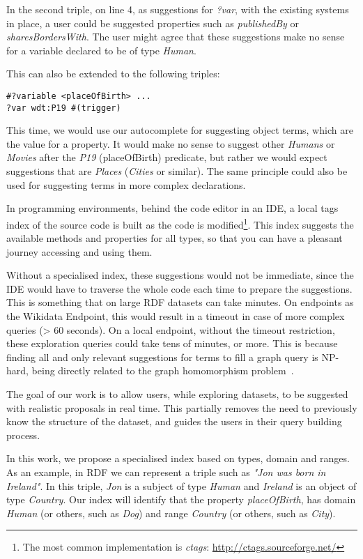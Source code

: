 In the second triple, on line 4, as suggestions for \textit{?var}, with the existing systems in place, a user could be suggested properties such as \textit{publishedBy} or \textit{sharesBordersWith}. 
The user might agree that these suggestions make no sense for a variable declared to be of type \textit{Human}. 

This can also be extended to the following triples:

\begin{verbatim}
#?variable <placeOfBirth> ...
?var wdt:P19 #(trigger)
\end{verbatim}

This time, we would use our autocomplete for suggesting object terms, which are the value for a property. 
It would make no sense to suggest other \textit{Humans} or \textit{Movies} after the \textit{P19} (placeOfBirth) predicate, but rather we would expect suggestions that are \textit{Places} (\textit{Cities} or similar). 
The same principle could also be used for suggesting terms in more complex declarations.

In programming environments, behind the code editor in an IDE, a local tags index of the source code is built as the code is modified\footnote{The most common implementation is \textit{ctags}: \url{http://ctags.sourceforge.net/}}. 
This index suggests the available methods and properties for all types, so that you can have a pleasant journey accessing and using them.

Without a specialised index, these suggestions would not be immediate, since the IDE would have to traverse the whole code each time to prepare the suggestions. 
This is something that on large RDF datasets can take minutes. 
On endpoints as the Wikidata Endpoint, this would result in a timeout in case of more complex queries (> 60 seconds). 
On a local endpoint, without the timeout restriction, these exploration queries could take tens of minutes, or more.  This is because finding all and only relevant suggestions for terms to fill a graph query is NP-hard, being directly related to the graph homomorphism problem~\cite{PerezAG09}.

The goal of our work is to allow users, while exploring datasets, to be suggested with realistic proposals in real time. 
This partially removes the need to previously know the structure of the dataset, and guides the users in their query building process.

In this work, we propose a specialised index based on types, domain and ranges. 
As an example, in RDF we can represent a triple such as \textit{"Jon was born in Ireland"}. 
In this triple, \textit{Jon} is a subject of type \textit{Human} and \textit{Ireland} is an object of type \textit{Country}. 
Our index will identify that the property \textit{placeOfBirth}, has domain \textit{Human} (or others, such as \textit{Dog}) and range \textit{Country} (or others, such as \textit{City}). 

